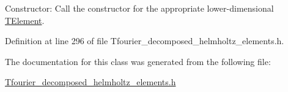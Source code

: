 Constructor\+: Call the constructor for the appropriate lower-\/dimensional \hyperlink{classoomph_1_1TElement}{T\+Element}. 



Definition at line 296 of file Tfourier\+\_\+decomposed\+\_\+helmholtz\+\_\+elements.\+h.



The documentation for this class was generated from the following file\+:\begin{DoxyCompactItemize}
\item 
\hyperlink{Tfourier__decomposed__helmholtz__elements_8h}{Tfourier\+\_\+decomposed\+\_\+helmholtz\+\_\+elements.\+h}\end{DoxyCompactItemize}
